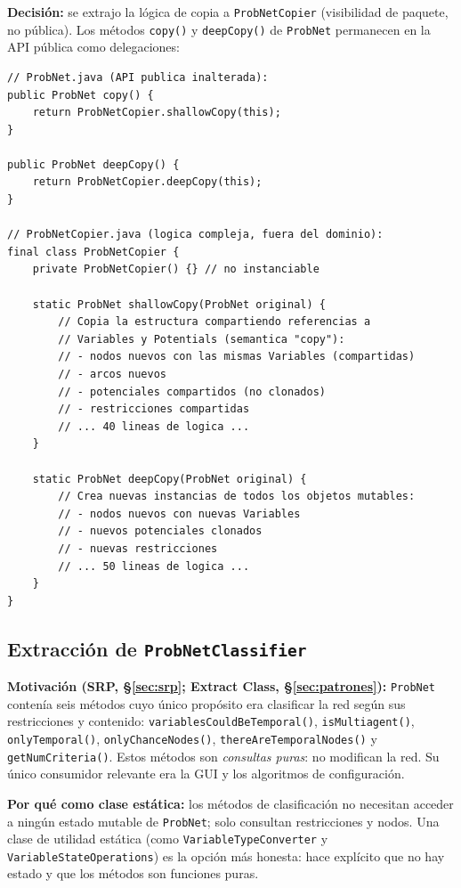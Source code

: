\documentclass[11pt,a4paper]{article}
\newcommand{\code}[1]{\texttt{#1}}
\begin{document}
\textbf{Decisión:} se extrajo la lógica de copia a \code{ProbNetCopier}
(visibilidad de paquete, no pública).  Los métodos \code{copy()} y
\code{deepCopy()} de \code{ProbNet} permanecen en la API pública como
delegaciones:

\begin{lstlisting}[caption={Extracción de la lógica de copia a \texttt{ProbNetCopier}.},
                   label=lst:copier]
// ProbNet.java (API publica inalterada):
public ProbNet copy() {
    return ProbNetCopier.shallowCopy(this);
}

public ProbNet deepCopy() {
    return ProbNetCopier.deepCopy(this);
}

// ProbNetCopier.java (logica compleja, fuera del dominio):
final class ProbNetCopier {
    private ProbNetCopier() {} // no instanciable

    static ProbNet shallowCopy(ProbNet original) {
        // Copia la estructura compartiendo referencias a
        // Variables y Potentials (semantica "copy"):
        // - nodos nuevos con las mismas Variables (compartidas)
        // - arcos nuevos
        // - potenciales compartidos (no clonados)
        // - restricciones compartidas
        // ... 40 lineas de logica ...
    }

    static ProbNet deepCopy(ProbNet original) {
        // Crea nuevas instancias de todos los objetos mutables:
        // - nodos nuevos con nuevas Variables
        // - nuevos potenciales clonados
        // - nuevas restricciones
        // ... 50 lineas de logica ...
    }
}
\end{lstlisting}

\subsection{Extracción de \texttt{ProbNetClassifier}}
\label{sec:classifier}

\textbf{Motivación (SRP, §\ref{sec:srp}; Extract Class, §\ref{sec:patrones}):}
\code{ProbNet} contenía seis métodos cuyo único propósito era clasificar
la red según sus restricciones y contenido:
\code{variablesCouldBeTemporal()}, \code{isMultiagent()},
\code{onlyTemporal()}, \code{onlyChanceNodes()},
\code{thereAreTemporalNodes()} y \code{getNumCriteria()}.  Estos métodos
son \emph{consultas puras}: no modifican la red.  Su único consumidor
relevante era la GUI y los algoritmos de configuración.

\textbf{Por qué como clase estática:} los métodos de clasificación no
necesitan acceder a ningún estado mutable de \code{ProbNet}; solo
consultan restricciones y nodos.  Una clase de utilidad estática (como
\code{VariableTypeConverter} y \code{VariableStateOperations}) es la
opción más honesta: hace explícito que no hay estado y que los métodos
son funciones puras.
\end{document}
